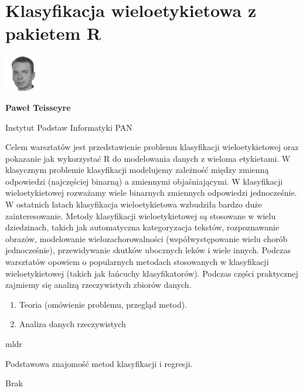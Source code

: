 \documentclass[\main/boa.tex]{subfiles}
\begin{document}
\section{Klasyfikacja wieloetykietowa z pakietem R}
\begin{minipage}[t]{0.915\textwidth}
	\center     
    \includegraphics[width=60px]{img/workshops/czarno_biale/pteisseyre-crop.png} 
\end{minipage}

\begin{minipage}{0.915\textwidth}
\centering
{\bf {} Paweł Teisseyre}
\end{minipage}

\vskip 0.3cm

\begin{affiliations}
\begin{minipage}{0.915\textwidth}
\centering
\large Instytut Podstaw Informatyki PAN  \\[2pt]
\end{minipage}
\end{affiliations}

\vskip 0.8cm

\opiswarsztatu Celem warsztatów jest przedstawienie problemu klasyfikacji wieloetykietowej oraz pokazanie jak wykorzystać R do modelowania danych z wieloma etykietami. W klasycznym problemie klasyfikacji modelujemy zależność między zmienną odpowiedzi (najczęściej binarną) a zmiennymi objaśniającymi. W klasyfikacji wieloetykietowej rozważamy wiele binarnych zmiennych odpowiedzi jednocześnie. W ostatnich latach klasyfikacja wieloetykietowa wzbudziła bardzo duże zainteresowanie. Metody klasyfikacji wieloetykietowej są stosowane w wielu dziedzinach, takich jak automatyczna kategoryzacja tekstów, rozpoznawanie obrazów, modelowanie wielozachorowalności (współwystępowanie wielu chorób jednocześnie), przewidywanie skutków ubocznych leków i wiele innych. Podczas warsztatów opowiem o popularnych metodach stosowanych w klasyfikacji wieloetykietowej (takich jak łańcuchy klasyfikatorów). Podczas części praktycznej zajmiemy się analizą rzeczywistych zbiorów danych.

\planwarsztatu
\begin{enumerate}
\item Teoria (omówienie problemu, przegląd metod).
\item Analiza danych rzeczywistych
\end{enumerate}	 

\pakiety mldr

\umiejetnosci Podstawowa znajomość metod klasyfikacji i regresji.

\wymagania Brak
\end{document}
